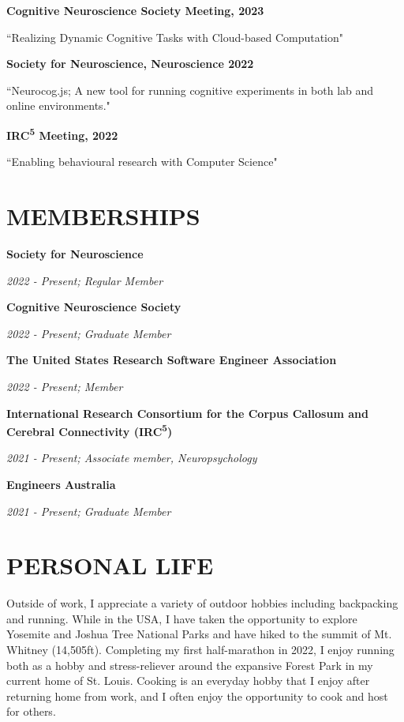 \documentclass{article}
\begin{document}
  \textbf{Cognitive Neuroscience Society Meeting, 2023}

  ``Realizing Dynamic Cognitive Tasks with Cloud-based Computation"

  \medbreak

  \textbf{Society for Neuroscience, Neuroscience 2022}

  ``Neurocog.js; A new tool for running cognitive experiments in both lab and online environments."

  \medbreak

  \textbf{IRC\textsuperscript{5} Meeting, 2022}

  ``Enabling behavioural research with Computer Science"

  \section*{\centering\uppercase{Memberships}}

  \large\textbf{Society for Neuroscience}

  \textit{2022 - Present; Regular Member}

  \medbreak

  \large\textbf{Cognitive Neuroscience Society}

  \textit{2022 - Present; Graduate Member}

  \medbreak

  \large\textbf{The United States Research Software Engineer Association}

  \textit{2022 - Present; Member}

  \medbreak

  \large\textbf{International Research Consortium for the Corpus Callosum and Cerebral Connectivity (IRC\textsuperscript{5})}

  \textit{2021 - Present; Associate member, Neuropsychology}

  \medbreak

  \large\textbf{Engineers Australia}

  \textit{2021 - Present; Graduate Member}

  \section*{\centering\uppercase{Personal Life}}

  Outside of work, I appreciate a variety of outdoor hobbies including backpacking and running. While in the USA, I have taken the opportunity to explore Yosemite and Joshua Tree National Parks and have hiked to the summit of Mt. Whitney (14,505ft). Completing my first half-marathon in 2022, I enjoy running both as a hobby and stress-reliever around the expansive Forest Park in my current home of St. Louis. Cooking is an everyday hobby that I enjoy after returning home from work, and I often enjoy the opportunity to cook and host for others.
\end{document}
